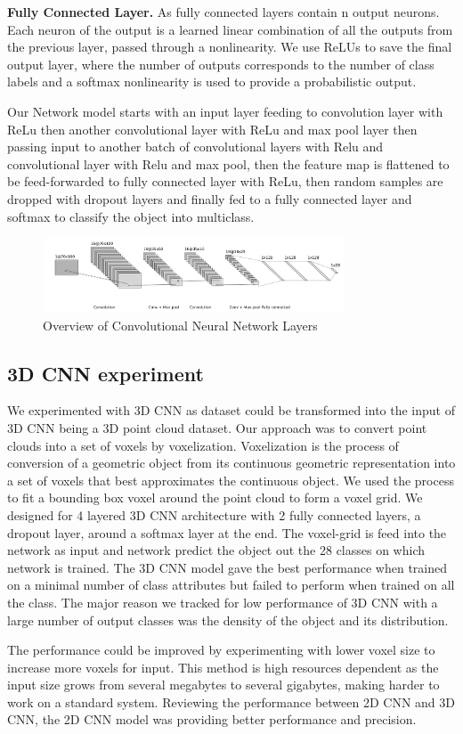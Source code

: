 \textbf{Fully Connected Layer.}
As fully connected layers contain n output neurons. Each neuron of the output is a learned linear
combination of all the outputs from the previous layer, passed through a nonlinearity.
We use ReLUs to save the final output layer, where the number of outputs corresponds
to the number of class labels and a softmax nonlinearity is used to provide a probabilistic output.


Our Network model starts with an input layer feeding to convolution layer with ReLu then
another convolutional layer with ReLu and max pool layer then passing input to another batch of convolutional layers
with Relu and convolutional layer with Relu and max pool, then the feature map is flattened to be feed-forwarded to
fully connected layer with ReLu, then random samples are dropped with dropout layers
and finally fed to a fully connected layer and softmax to classify the object into multiclass.

\begin{figure}[!h]
     \begin{center}
       \includegraphics[width=0.8\textwidth]{./images/object_net.pdf}
       \caption{Overview of Convolutional Neural Network Layers}
       \label{fig:cnn}
     \end{center}
\end{figure}

\subsection{3D CNN experiment}
We experimented with 3D CNN as dataset could be transformed into the input of 3D CNN being a 3D point cloud dataset. 
Our approach was to convert point clouds into a set of voxels by voxelization. Voxelization is the process of conversion 
of a geometric object from its continuous geometric representation into a set of voxels that best approximates the continuous
object. We used the process to fit a bounding box voxel around the point cloud to form a voxel grid.
We designed for 4 layered 3D CNN architecture with 2 fully connected layers, a dropout layer, around a softmax layer at the end. 
The voxel-grid is feed into the network as input and network predict the object out the 28 classes on which network is trained. 
The 3D CNN model gave the best performance when trained on a minimal number of class attributes but failed to perform when trained on all the class. 
The major reason we tracked for low performance of 3D CNN with a large number of output classes was the density of the object and its distribution.

The performance could be improved by experimenting with lower voxel size to increase more voxels for input. 
This method is high resources dependent as the input size grows from several megabytes to several gigabytes, making harder to work on a standard system.
Reviewing the performance between 2D CNN and 3D CNN, the 2D CNN model was providing better performance and precision.
